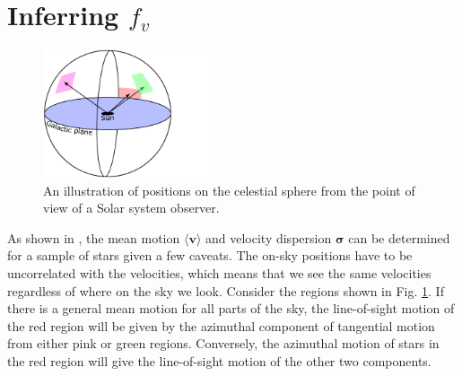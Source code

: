 \section{Inferring $f_v$}\label{sec:p2-inferring}
\begin{figure}[t]
    \centering
    \includegraphics[width=0.45\textwidth]{images/projection.pdf}
    \caption{An illustration of positions on the celestial sphere from the point of view of a Solar system observer.} %
    \label{fig:projection}
\end{figure}
As shown in \cite{dehnen:98b}, the mean motion $\langle\pmb{v}\rangle$ and velocity dispersion $\pmb{\sigma}$ can be determined for a sample of stars given a few caveats. The on-sky positions have to be uncorrelated with the velocities, which means that we see the same velocities regardless of where on the sky we look. Consider the regions shown in Fig. \ref{fig:projection}. If there is a general mean motion for all parts of the sky, the line-of-sight motion of the red region will be given by the azimuthal component of tangential motion from either pink or green regions. Conversely, the azimuthal motion of stars in the red region will give the line-of-sight motion of the other two components. 

